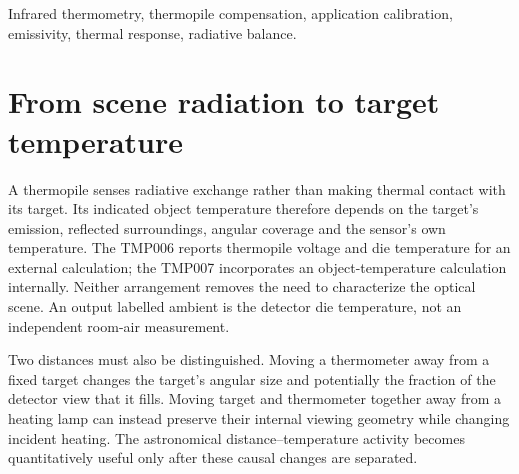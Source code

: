 \begin{abstract}
An infrared temperature indication combines scene radiation with the detector's thermal state and application calibration. Two example investigations expose different parts of that inference. A TMP006 compensation model gives a target-temperature rise of 21.88~K while die temperature rises by only 0.204~K; changing sensitivity by ten percent shifts the hot-interval result from 44.91~$^\circ$C to 43.12 or 47.06~$^\circ$C. A separate TMP007 distance sequence has an outward--return difference of 1.040~K at the same displacement. The first example quantifies a calibration dependence hidden by small short-term scatter; the second prevents an equilibrium heating law from being inferred from a history-dependent trace. A constant-view translation geometry separates source-distance heating from changes in the thermometer's view.
\end{abstract}
\begin{IEEEkeywords}
Infrared thermometry, thermopile compensation, application calibration, emissivity, thermal response, radiative balance.
\end{IEEEkeywords}

\section{From scene radiation to target temperature}
A thermopile senses radiative exchange rather than making thermal contact with its target. Its indicated object temperature therefore depends on the target's emission, reflected surroundings, angular coverage and the sensor's own temperature. The TMP006 reports thermopile voltage and die temperature for an external calculation\cite{tmp006}; the TMP007 incorporates an object-temperature calculation internally\cite{tmp007}. Neither arrangement removes the need to characterize the optical scene. An output labelled ambient is the detector die temperature, not an independent room-air measurement.

Two distances must also be distinguished. Moving a thermometer away from a fixed target changes the target's angular size and potentially the fraction of the detector view that it fills. Moving target and thermometer together away from a heating lamp can instead preserve their internal viewing geometry while changing incident heating. The astronomical distance--temperature activity\cite{astrolab2022} becomes quantitatively useful only after these causal changes are separated.

